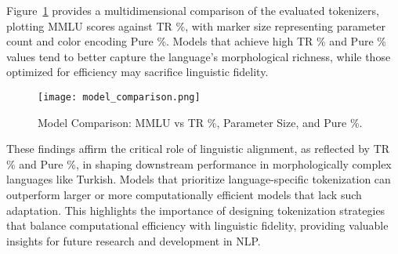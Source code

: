 Figure~\ref{fig:model_comparison} provides a multidimensional comparison of the evaluated tokenizers, plotting MMLU scores against TR \%, with marker size representing parameter count and color encoding Pure \%. Models that achieve high TR \% and Pure \% values tend to better capture the language’s morphological richness, while those optimized for efficiency may sacrifice linguistic fidelity.

\begin{figure}[ht]
    \centering
    \texttt{[image: model\_comparison.png]}
    \caption{Model Comparison: MMLU vs TR \%, Parameter Size, and Pure \%.}
    \label{fig:model_comparison}
\end{figure}
\FloatBarrier

These findings affirm the critical role of linguistic alignment, as reflected by TR \% and Pure \%, in shaping downstream performance in morphologically complex languages like Turkish. Models that prioritize language-specific tokenization can outperform larger or more computationally efficient models that lack such adaptation. This highlights the importance of designing tokenization strategies that balance computational efficiency with linguistic fidelity, providing valuable insights for future research and development in NLP.
